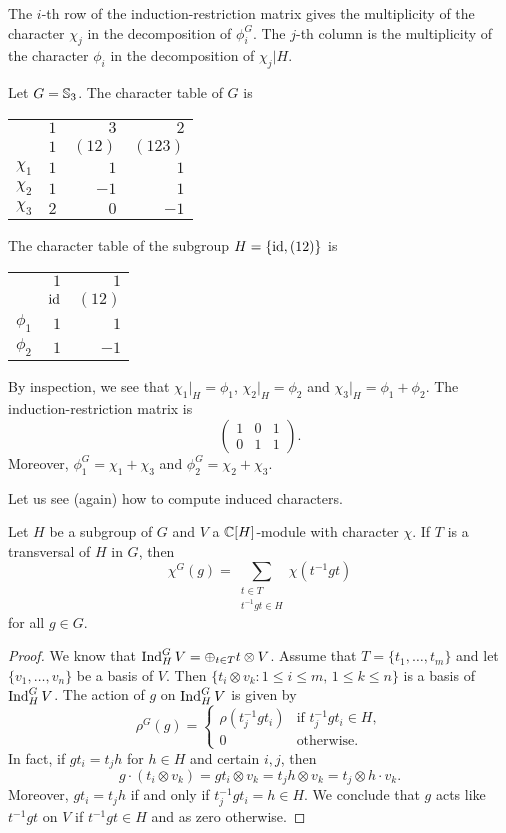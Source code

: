 The $i$-th row of the induction-restriction matrix gives the multiplicity of the character $\chi_j$ in the decomposition of $\phi_i^G$. The $j$-th column is the multiplicity of the 
character $\phi_i$ in the decomposition of $\chi_j|H$.

\begin{example}
Let $G=\mathbb{S}_3$. 
The character table of $G$ is 
	\begin{center}
		\begin{tabular}{|c|rrr|}
			\hline
			& $1$ & $3$ & $2$\tabularnewline
			& $1$ & $(12)$ & $(123)$ \tabularnewline
			\hline 
			$\chi_{1}$ & $1$ & $1$ & $1$\tabularnewline
			$\chi_{2}$ & $1$ & $-1$ & $1$ \tabularnewline
			$\chi_{3}$ & $2$ & $0$ & $-1$ \tabularnewline
			\hline
		\end{tabular}
	\end{center}
The character table of the subgroup $H=\{\operatorname{id},(12)\}$ is  
\begin{center}
\begin{tabular}{|c|rr|}
\hline 
& $1$ & $1$ \tabularnewline
& $\operatorname{id}$ & $(12)$ \tabularnewline
\hline 
$\phi_{1}$ & $1$ & $1$ \tabularnewline
$\phi_{2}$ & $1$ & $-1$\tabularnewline
\hline
\end{tabular}
\end{center}
By inspection, we see that
$\chi_1|_H=\phi_1$, $\chi_2|_H=\phi_2$ and 
$\chi_3|_H=\phi_1+\phi_2$. 
The induction-restriction matrix is 
\[
\begin{pmatrix}
1 & 0 & 1\\
0 & 1 & 1
\end{pmatrix}.
\]
Moreover, $\phi_1^G=\chi_1+\chi_3$ and  $\phi_2^G=\chi_2+\chi_3$. 
\end{example}

Let us see (again) how to compute 
induced characters. 

\begin{proposition}
Let $H$ be a subgroup of $G$ and $V$ a $\mathbb{C}[H]$-module with character $\chi$. If  
$T$ is a transversal of $H$ in $G$, then  
\[
\chi^G(g)=\sum_{\substack{t\in T\\t^{-1}gt\in H}}\chi(t^{-1}gt)
\]
for all $g\in G$. 
\end{proposition}

\begin{proof}
    We know that $\operatorname{Ind}_H^GV=\oplus_{t\in T}t\otimes V$. 
    Assume that $T=\{t_1,\dots,t_m\}$ 
    and let $\{v_1,\dots,v_n\}$ be a basis of $V$. 
    Then $\{t_i\otimes v_k:1\leq i\leq m,\,1\leq k\leq n\}$ is a basis of $\operatorname{Ind}_H^GV$. The action of 
    $g$ on $\operatorname{Ind}_H^GV$ is given by 
    \[
    \rho^G(g)=\begin{cases}
    \rho(t_j^{-1}gt_i) & \text{if $t_j^{-1}gt_i\in H$},\\
    0 & \text{otherwise}.
    \end{cases}
    \]
    In fact, if $gt_i=t_jh$ for $h\in H$ and certain $i,j$, then  
    \[
    g\cdot (t_i\otimes v_k)=gt_i\otimes v_k=t_jh\otimes v_k=t_j\otimes h\cdot v_k. 
    \]
    Moreover, $gt_i=t_jh$ if and only if $t_j^{-1}gt_i=h\in H$. We conclude that 
    $g$ acts like $t^{-1}gt$ on $V$ if $t^{-1}gt\in H$ and as zero otherwise.  
\end{proof}

